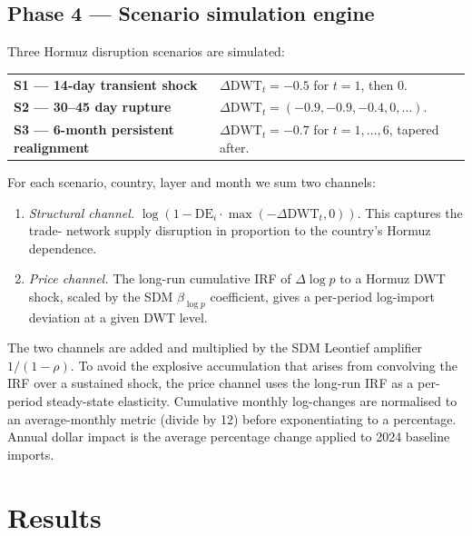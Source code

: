 \documentclass[11pt,a4paper]{article}
\begin{document}
\subsection{Phase 4 --- Scenario simulation engine}

Three Hormuz disruption scenarios are simulated:

\smallskip
\begin{tabular}{ll}
\textbf{S1 --- 14-day transient shock} &
   $\Delta\!\text{DWT}_t = -0.5$ for $t = 1$, then 0. \\[2pt]
\textbf{S2 --- 30--45 day rupture} &
   $\Delta\!\text{DWT}_t = (-0.9, -0.9, -0.4, 0, \dots)$. \\[2pt]
\textbf{S3 --- 6-month persistent realignment} &
   $\Delta\!\text{DWT}_t = -0.7$ for $t = 1, \dots, 6$, tapered after.
\end{tabular}
\smallskip

For each scenario, country, layer and month we sum two channels:

\begin{enumerate}[leftmargin=1.4em, itemsep=0.1em]
  \item \emph{Structural channel.} $\log(1 - \text{DE}_i \cdot
        \max(-\Delta\!\text{DWT}_t, 0))$. This captures the trade-
        network supply disruption in proportion to the country's
        Hormuz dependence.
  \item \emph{Price channel.} The long-run cumulative IRF of
        $\Delta\!\log p$ to a Hormuz DWT shock, scaled by the SDM
        $\beta_{\log p}$ coefficient, gives a per-period log-import
        deviation at a given DWT level.
\end{enumerate}

The two channels are added and multiplied by the SDM Leontief
amplifier $1 / (1 - \rho)$. To avoid the explosive accumulation
that arises from convolving the IRF over a sustained shock, the
price channel uses the long-run IRF as a per-period steady-state
elasticity. Cumulative monthly log-changes are normalised to an
average-monthly metric (divide by 12) before exponentiating to a
percentage. Annual dollar impact is the average percentage change
applied to 2024 baseline imports.

\section{Results}
\end{document}
